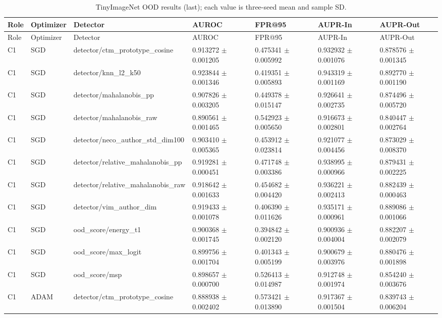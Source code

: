 \begin{longtable}{lllllll}
\caption{TinyImageNet OOD results (last); each value is three-seed mean and sample SD.}\\
Role & Optimizer & Detector & AUROC & FPR@95 & AUPR-In & AUPR-Out \\
\hline
\endfirsthead
Role & Optimizer & Detector & AUROC & FPR@95 & AUPR-In & AUPR-Out \\
\hline
\endhead
C1 & SGD & detector/ctm\_prototype\_cosine & 0.913272 $\pm$ 0.001205 & 0.475341 $\pm$ 0.005992 & 0.932932 $\pm$ 0.001076 & 0.878576 $\pm$ 0.001345 \\
C1 & SGD & detector/knn\_l2\_k50 & 0.923844 $\pm$ 0.001346 & 0.419351 $\pm$ 0.005893 & 0.943319 $\pm$ 0.001169 & 0.892770 $\pm$ 0.001190 \\
C1 & SGD & detector/mahalanobis\_pp & 0.907826 $\pm$ 0.003205 & 0.449378 $\pm$ 0.015147 & 0.926641 $\pm$ 0.002735 & 0.874496 $\pm$ 0.005720 \\
C1 & SGD & detector/mahalanobis\_raw & 0.890561 $\pm$ 0.001465 & 0.542923 $\pm$ 0.005650 & 0.916673 $\pm$ 0.002801 & 0.840447 $\pm$ 0.002764 \\
C1 & SGD & detector/neco\_author\_std\_dim100 & 0.903410 $\pm$ 0.005365 & 0.453912 $\pm$ 0.023814 & 0.921077 $\pm$ 0.004456 & 0.873029 $\pm$ 0.008370 \\
C1 & SGD & detector/relative\_mahalanobis\_pp & 0.919281 $\pm$ 0.000451 & 0.471748 $\pm$ 0.003386 & 0.938995 $\pm$ 0.000966 & 0.879431 $\pm$ 0.002225 \\
C1 & SGD & detector/relative\_mahalanobis\_raw & 0.918642 $\pm$ 0.001633 & 0.454682 $\pm$ 0.004420 & 0.936221 $\pm$ 0.002413 & 0.882439 $\pm$ 0.000463 \\
C1 & SGD & detector/vim\_author\_dim & 0.919433 $\pm$ 0.001078 & 0.406390 $\pm$ 0.011626 & 0.935171 $\pm$ 0.000961 & 0.889086 $\pm$ 0.001066 \\
C1 & SGD & ood\_score/energy\_t1 & 0.900368 $\pm$ 0.001745 & 0.394842 $\pm$ 0.002120 & 0.900936 $\pm$ 0.004004 & 0.882207 $\pm$ 0.002079 \\
C1 & SGD & ood\_score/max\_logit & 0.899756 $\pm$ 0.001704 & 0.401343 $\pm$ 0.005199 & 0.900679 $\pm$ 0.003976 & 0.880476 $\pm$ 0.001898 \\
C1 & SGD & ood\_score/msp & 0.898657 $\pm$ 0.000700 & 0.526413 $\pm$ 0.014987 & 0.912748 $\pm$ 0.001974 & 0.854240 $\pm$ 0.003676 \\
C1 & ADAM & detector/ctm\_prototype\_cosine & 0.888938 $\pm$ 0.002402 & 0.573421 $\pm$ 0.013890 & 0.917367 $\pm$ 0.001504 & 0.839743 $\pm$ 0.006204 \\

\end{longtable}
